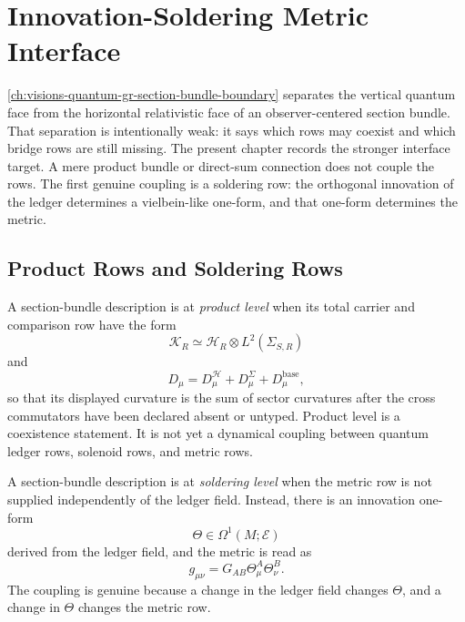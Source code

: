\chapter{Innovation-Soldering Metric Interface}
\label{ch:visions-innovation-soldering-metric-interface}

\autoref{ch:visions-quantum-gr-section-bundle-boundary} separates the
vertical quantum face from the horizontal relativistic face of an
observer-centered section bundle. That separation is intentionally weak:
it says which rows may coexist and which bridge rows are still missing.
The present chapter records the stronger interface target. A mere
product bundle or direct-sum connection does not couple the rows. The
first genuine coupling is a soldering row: the orthogonal innovation of
the ledger determines a vielbein-like one-form, and that one-form
determines the metric.

\section{Product Rows and Soldering Rows}
\label{sec:innovation-soldering-product-versus-soldering}

\begin{definition}
\label{def:innovation-soldering-product-level-coexistence}
A section-bundle description is at \emph{product level} when its total
carrier and comparison row have the form
$$
\mathcal K_R\simeq\mathcal H_R\otimes L^2(\Sigma_{S,R})
$$
and
$$
D_\mu
=
D_\mu^{\mathcal H}
+D_\mu^{\Sigma}
+D_\mu^{\mathrm{base}},
$$
so that its displayed curvature is the sum of sector curvatures after
the cross commutators have been declared absent or untyped. Product
level is a coexistence statement. It is not yet a dynamical coupling
between quantum ledger rows, solenoid rows, and metric rows.
\end{definition}

\begin{definition}
\label{def:innovation-soldering-level-coupling}
A section-bundle description is at \emph{soldering level} when the
metric row is not supplied independently of the ledger field. Instead,
there is an innovation one-form
$$
\Theta\in\Omega^1(M;\mathcal E)
$$
derived from the ledger field, and the metric is read as
$$
g_{\mu\nu}=G_{AB}\Theta^A_{\mu}\Theta^B_{\nu}.
$$
The coupling is genuine because a change in the ledger field changes
$\Theta$, and a change in $\Theta$ changes the metric row.
\end{definition}

